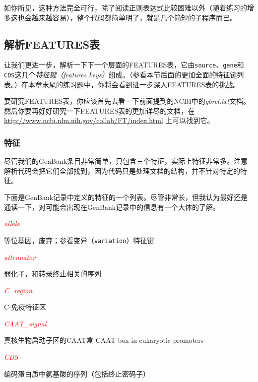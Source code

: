 如你所见，这种方法完全可行，除了阅读正则表达式比较困难以外（随着练习的增多这也会越来越容易），整个代码都简单明了，就是几个简短的子程序而已。

\subsection{解析FEATURES表}
让我们更进一步，解析一下下一个层面的FEATURES表，它由\verb|source|、\verb|gene|和\verb|CDS|这几个\textit{特征键（features keys）}组成。（参看本节后面的更加全面的特征键列表。）在本章末尾的练习题中，你将会看到进一步深入FEATURES表的挑战。

要研究FEATURES表，你应该首先去看一下前面提到的NCBI中的\textit{gbrel.txt}文档。然后你要再好好研究一下FEATURES表的更加详尽的文档，在 \href{http://www.ncbi.nlm.nih.gov/collab/FT/index.html}{http://www.ncbi.nlm.nih.gov/collab/FT/index.html} 上可以找到它。

\subsubsection{特征}
尽管我们的GenBank条目非常简单，只包含三个特征，实际上特征非常多。注意解析代码会把它们全部找到，因为代码只是处理文档的结构，并不针对特定的特征。

下面是GenBank记录中定义的特征的一个列表。尽管非常长，但我认为最好还是通读一下，对可能会出现在GenBank记录中的信息有一个大体的了解。

\textcolor{red}{\textit{allele}}
\begin{adjustwidth}{4em}{}
等位基因，废弃；参看变异（\verb|variation|）特征键
\end{adjustwidth}

\textcolor{red}{\textit{attenuator}}
\begin{adjustwidth}{4em}{}
弱化子，和转录终止相关的序列
\end{adjustwidth}

\textcolor{red}{\textit{C\_region}}
\begin{adjustwidth}{4em}{}
C-免疫特征区
\end{adjustwidth}

\textcolor{red}{\textit{CAAT\_signal}}
\begin{adjustwidth}{4em}{}
真核生物启动子区的CAAT盒
CAAT box in eukaryotic promoters
\end{adjustwidth}

\textcolor{red}{\textit{CDS}}
\begin{adjustwidth}{4em}{}
编码蛋白质中氨基酸的序列（包括终止密码子）
\end{adjustwidth}

